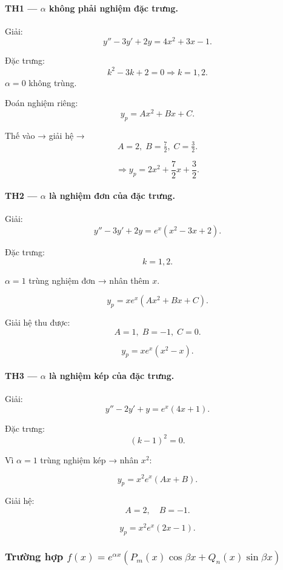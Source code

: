 \documentclass[12pt,a4paper]{article}
\begin{document}
\paragraph{TH1 — $\alpha$ không phải nghiệm đặc trưng.}

Giải:
\[
y'' - 3y' + 2y = 4x^2 + 3x - 1.
\]

Đặc trưng:
\[
k^2 - 3k + 2 = 0 \Rightarrow k=1,2.
\]
$\alpha=0$ không trùng.

Đoán nghiệm riêng:
\[
y_p = Ax^2 + Bx + C.
\]

Thế vào → giải hệ → 
\[
A=2,\; B=\tfrac72,\; C=\tfrac32.
\]

\[
\Rightarrow y_p = 2x^2 + \frac72 x + \frac32.
\]

\bigskip

\paragraph{TH2 — $\alpha$ là nghiệm đơn của đặc trưng.}

Giải:
\[
y'' - 3y' + 2y = e^{x}(x^2 - 3x + 2).
\]

Đặc trưng:
\[
k=1,2.
\]

$\alpha=1$ trùng nghiệm đơn → nhân thêm $x$.

\[
y_p = x e^{x}(Ax^2 + Bx + C).
\]

Giải hệ thu được:
\[
A=1,\; B=-1,\; C=0.
\]

\[
y_p = x e^{x}(x^2 - x).
\]

\bigskip

\paragraph{TH3 — $\alpha$ là nghiệm kép của đặc trưng.}

Giải:
\[
y'' - 2y' + y = e^{x}(4x+1).
\]

Đặc trưng:
\[
(k-1)^2=0.
\]

Vì $\alpha=1$ trùng nghiệm kép → nhân $x^2$:

\[
y_p = x^2 e^{x}(Ax + B).
\]

Giải hệ:
\[
A=2,\quad B=-1.
\]

\[
y_p = x^2 e^{x}(2x-1).
\]

\bigskip

\subsubsection{Trường hợp $f(x)=e^{\alpha x}(P_m(x)\cos\beta x + Q_n(x)\sin\beta x)$}
\end{document}
